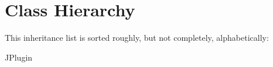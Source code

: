 \section{Class Hierarchy}
This inheritance list is sorted roughly, but not completely, alphabetically\+:\begin{DoxyCompactList}
\item J\+Plugin\begin{DoxyCompactList}
\item {}
\end{DoxyCompactList}
\end{DoxyCompactList}
